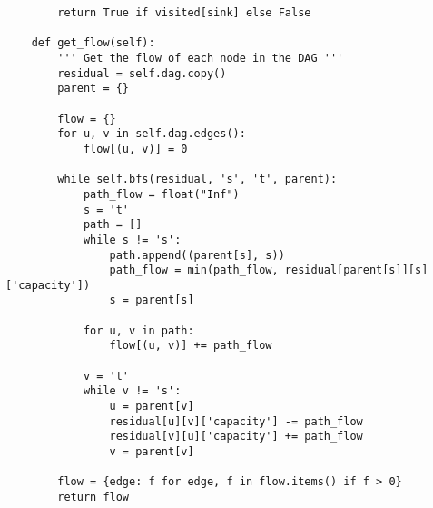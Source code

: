 \documentclass[addpoints]{exam}
\begin{document}
\begin{questions}
\begin{solution}
\begin{lstlisting}
        return True if visited[sink] else False

    def get_flow(self):
        ''' Get the flow of each node in the DAG '''
        residual = self.dag.copy()
        parent = {}

        flow = {}
        for u, v in self.dag.edges():
            flow[(u, v)] = 0

        while self.bfs(residual, 's', 't', parent):
            path_flow = float("Inf")
            s = 't'
            path = []
            while s != 's':
                path.append((parent[s], s))
                path_flow = min(path_flow, residual[parent[s]][s]['capacity'])
                s = parent[s]

            for u, v in path:
                flow[(u, v)] += path_flow

            v = 't'
            while v != 's':
                u = parent[v]
                residual[u][v]['capacity'] -= path_flow
                residual[v][u]['capacity'] += path_flow
                v = parent[v]

        flow = {edge: f for edge, f in flow.items() if f > 0}
        return flow
    \end{lstlisting}
  \end{solution}
\end{questions}
\end{document}

